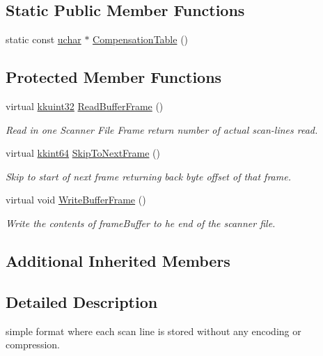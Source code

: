 \subsection*{Static Public Member Functions}
\begin{DoxyCompactItemize}
\item 
static const \hyperlink{namespace_k_k_b_ace9969169bf514f9ee6185186949cdf7}{uchar} $\ast$ \hyperlink{class_k_k_l_s_c_1_1_scanner_file_simple_a0785f3ea487442d3c80d4ee70872b475}{Compensation\+Table} ()
\end{DoxyCompactItemize}
\subsection*{Protected Member Functions}
\begin{DoxyCompactItemize}
\item 
virtual \hyperlink{namespace_k_k_b_af8d832f05c54994a1cce25bd5743e19a}{kkuint32} \hyperlink{class_k_k_l_s_c_1_1_scanner_file_simple_a5b1c2dc90fcc2741525b8039c8000b34}{Read\+Buffer\+Frame} ()
\begin{DoxyCompactList}\small\item\em Read in one Scanner File Frame return number of actual scan-\/lines read. \end{DoxyCompactList}\item 
virtual \hyperlink{namespace_k_k_b_aa3486b1c5ea9162b3b020c69f72826eb}{kkint64} \hyperlink{class_k_k_l_s_c_1_1_scanner_file_simple_a96d7f13db52b74fe6db55f8358d09e02}{Skip\+To\+Next\+Frame} ()
\begin{DoxyCompactList}\small\item\em Skip to start of next frame returning back byte offset of that frame. \end{DoxyCompactList}\item 
virtual void \hyperlink{class_k_k_l_s_c_1_1_scanner_file_simple_aa0a075b31b14eefdf517d09aaed5a7d3}{Write\+Buffer\+Frame} ()
\begin{DoxyCompactList}\small\item\em Write the contents of \textquotesingle{}frame\+Buffer\textquotesingle{} to he end of the scanner file. \end{DoxyCompactList}\end{DoxyCompactItemize}
\subsection*{Additional Inherited Members}


\subsection{Detailed Description}
simple format where each scan line is stored without any encoding or compression. 

